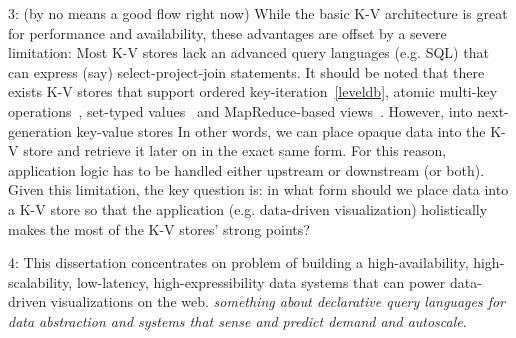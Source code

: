 \documentclass[11pt, oneside]{report}
\begin{document}
3: (by no means a good flow right now) While the basic K-V architecture is great for performance and availability, these advantages are offset by a severe limitation: Most K-V stores lack an advanced query languages (e.g. SQL) that can express (say) select-project-join statements. It should be noted that there exists K-V stores that support ordered key-iteration~\ref{leveldb}, atomic multi-key operations~\cite{gun}, set-typed values~\cite{redis} and MapReduce-based views~\cite{couchdb}. However,  into next-generation key-value stores In other words, we can place opaque data into the K-V store and retrieve it later on in the exact same form. For this reason, application logic has to be handled either upstream or downstream (or both). Given this limitation, the key question is: in what form should we place data into a K-V store so that the application (e.g. data-driven visualization) holistically makes the most of the K-V stores' strong points?

4: This dissertation concentrates on problem of building a high-availability, high-scalability, low-latency, high-expressibility data systems that can power data-driven visualizations on the web. \emph{something about declarative query languages for data abstraction and systems that sense and predict demand and autoscale}.

\end{document}
